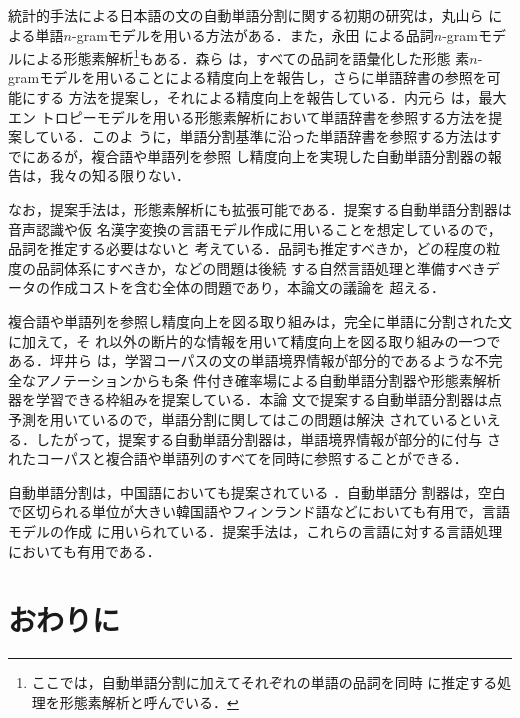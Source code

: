 \documentclass[japanese]{jnlp_JS2.0}
\begin{document}
統計的手法による日本語の文の自動単語分割に関する初期の研究は，丸山ら
\cite{確率的形態素解析}による単語$n$-gramモデルを用いる方法がある．また，永田
\cite{統計的言語モデルとN-best探索を用いた日本語形態素解析法}による品詞$n$-gramモデ
ルによる形態素解析\footnote{ここでは，自動単語分割に加えてそれぞれの単語の品詞を同時
に推定する処理を形態素解析と呼んでいる．}もある．森ら
\cite{形態素クラスタリングによる形態素解析精度の向上}は，すべての品詞を語彙化した形態
素$n$-gramモデルを用いることによる精度向上を報告し，さらに単語辞書の参照を可能にする
方法を提案し，それによる精度向上を報告している．内元ら
\cite{最大エントロピーモデルに基づく形態素解析.--未知語の問題の解決策--}は，最大エン
トロピーモデルを用いる形態素解析において単語辞書を参照する方法を提案している．このよ
うに，単語分割基準に沿った単語辞書を参照する方法はすでにあるが，複合語や単語列を参照
し精度向上を実現した自動単語分割器の報告は，我々の知る限りない．

なお，提案手法は，形態素解析にも拡張可能である．提案する自動単語分割器は音声認識や仮
名漢字変換の言語モデル作成に用いることを想定しているので，品詞を推定する必要はないと
考えている．品詞も推定すべきか，どの程度の粒度の品詞体系にすべきか，などの問題は後続
する自然言語処理と準備すべきデータの作成コストを含む全体の問題であり，本論文の議論を
超える．

複合語や単語列を参照し精度向上を図る取り組みは，完全に単語に分割された文に加えて，そ
れ以外の断片的な情報を用いて精度向上を図る取り組みの一つである．坪井ら
\cite{日本語単語分割の分野適応のための部分的アノテーションを用いた条件付き確率場の学習}
は，学習コーパスの文の単語境界情報が部分的であるような不完全なアノテーションからも条
件付き確率場による自動単語分割器や形態素解析器を学習できる枠組みを提案している．本論
文で提案する自動単語分割器は点予測を用いているので，単語分割に関してはこの問題は解決
されているといえる．したがって，提案する自動単語分割器は，単語境界情報が部分的に付与
されたコーパスと複合語や単語列のすべてを同時に参照することができる．

自動単語分割は，中国語においても提案されている
\cite{A.Stochastic.Finite-State.Word-Segmentation.Algorithm.for.Chinese}．自動単語分
割器は，空白で区切られる単位が大きい韓国語やフィンランド語などにおいても有用で，言語
モデルの作成
\cite{Korean.large.vocabulary.continuous.speech.recognition.with.morpheme-based.recognition.units,Unlimited.vocabulary.speech.recognition.with.morph.language.models.applied.to.Finnish}
に用いられている．提案手法は，これらの言語に対する言語処理においても有用である．


\section{おわりに}
\end{document}

